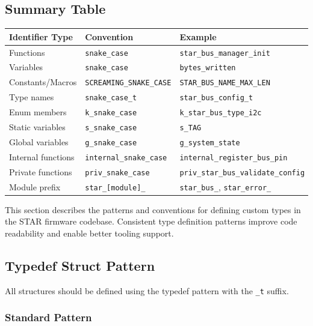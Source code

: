 \subsection{Summary Table}

\begin{center}
\begin{tabular}{|l|l|l|}
\hline
\textbf{Identifier Type} & \textbf{Convention} & \textbf{Example} \\
\hline
Functions & \texttt{snake\_case} & \texttt{star\_bus\_manager\_init} \\
\hline
Variables & \texttt{snake\_case} & \texttt{bytes\_written} \\
\hline
Constants/Macros & \texttt{SCREAMING\_SNAKE\_CASE} & \texttt{STAR\_BUS\_NAME\_MAX\_LEN} \\
\hline
Type names & \texttt{snake\_case\_t} & \texttt{star\_bus\_config\_t} \\
\hline
Enum members & \texttt{k\_snake\_case} & \texttt{k\_star\_bus\_type\_i2c} \\
\hline
Static variables & \texttt{s\_snake\_case} & \texttt{s\_TAG} \\
\hline
Global variables & \texttt{g\_snake\_case} & \texttt{g\_system\_state} \\
\hline
Internal functions & \texttt{internal\_snake\_case} & \texttt{internal\_register\_bus\_pin} \\
\hline
Private functions & \texttt{priv\_snake\_case} & \texttt{priv\_star\_bus\_validate\_config} \\
\hline
Module prefix & \texttt{star\_[module]\_} & \texttt{star\_bus\_}, \texttt{star\_error\_} \\
\hline
\end{tabular}
\end{center}



This section describes the patterns and conventions for defining custom types in the STAR firmware codebase. Consistent type definition patterns improve code readability and enable better tooling support.

\subsection{Typedef Struct Pattern}

All structures should be defined using the typedef pattern with the \texttt{\_t} suffix.

\subsubsection{Standard Pattern}

